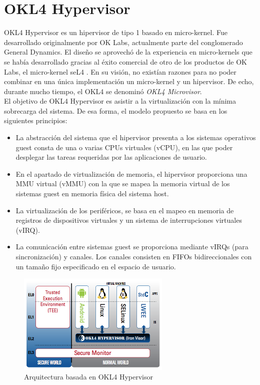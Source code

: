 \section{OKL4 Hypervisor}
OKL4 Hypervisor \cite{okl4} es un hipervisor de tipo 1 basado en micro-kernel. Fue desarrollado originalmente por OK Labs, actualmente parte del conglomerado General Dynamics. El diseño se aprovechó de la experiencia en micro-kernels que se había desarrollado gracias al éxito comercial de otro de los productos de OK Labs, el micro-kernel seL4 \cite{seL4}. En su visión, no existían razones para no poder combinar en una única implementación un micro-kernel y un hipervisor. De echo, durante mucho tiempo, el OKL4 se denominó \textit{OKL4 Microvisor}.\\
El objetivo de OKL4 Hypervisor es asistir a la virtualización con la mínima sobrecarga del sistema. De esa forma, el modelo propuesto se basa en los siguientes principios:
\begin{itemize}
  \item La abstracción del sistema que el hipervisor presenta a los sistemas operativos guest consta de una o varias CPUs virtuales (\acrshort{vCPU}), en las que poder desplegar las tareas requeridas por las aplicaciones de usuario.
  \item En el apartado de virtualización de memoria, el hipervisor proporciona una MMU virtual (\acrshort{vMMU}) con la que se mapea la memoria virtual de los sistemas guest en memoria física del sistema host.
  \item La virtualización de los periféricos, se basa en el mapeo en memoria de registros de dispositivos virtuales y un sistema de interrupciones virtuales (\acrshort{vIRQ}).
  \item La comunicación entre sistemas guest se proporciona mediante \acrshort{vIRQ}s (para sincronización) y canales. Los canales consisten en FIFOs bidireccionales con un tamaño fijo especificado en el espacio de usuario.
\end{itemize}
\begin{figure}[!htb]
	\centering
	\includegraphics[width=0.65\textwidth]{recursos/OK_L4_Microvisor.png}
	\caption{Arquitectura basada en OKL4 Hypervisor}
	\label{fig:OK_L4_Microvisor}
\end{figure}
